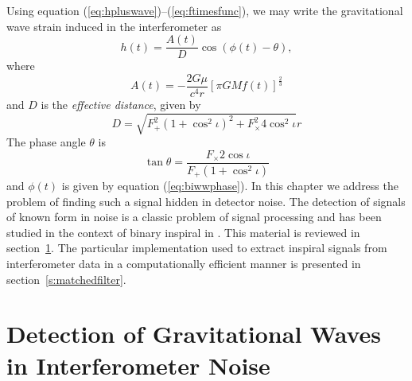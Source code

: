 
Using equation (\ref{eq:hpluswave})--(\ref{eq:ftimesfunc}), we may write the
gravitational wave strain induced in the interferometer as
\begin{equation}
h(t) = \frac{A(t)}{D} \cos\left( \phi(t) - \theta \right),
\label{eq:rootwaveform}
\end{equation}
where
\begin{equation}
A(t) = - \frac{2G\mu}{c^4 r} \left[ \pi GM f(t) \right]^\frac{2}{3}
\end{equation}
and $D$ is the \emph{effective distance}, given by
\begin{equation}
D = \sqrt{F_+^2 (1 + \cos^2 \iota)^2 + F_\times^2 4 \cos^2 \iota} r
\end{equation}
The phase angle $\theta$ is
\begin{equation}
\tan \theta = \frac{F_\times 2\cos \iota}{F_+(1 + \cos^2 \iota)}
\end{equation}
and $\phi(t)$ is given by equation (\ref{eq:biwwphase}).
In this chapter we address the problem of finding such a signal hidden in
detector noise. The detection of signals of known form in noise is a classic
problem of signal processing\cite{wainstein:1962} and has been studied in the
context of binary inspiral in \cite{Finn:1992wt,Finn:1992xs}. This material is
reviewed in section~\ref{s:detectiontheory}. The particular implementation
used to extract inspiral signals from interferometer data in a computationally
efficient manner is presented in section~\ref{s:matchedfilter}.

\section{Detection of Gravitational Waves in Interferometer Noise}
\label{s:detectiontheory}

